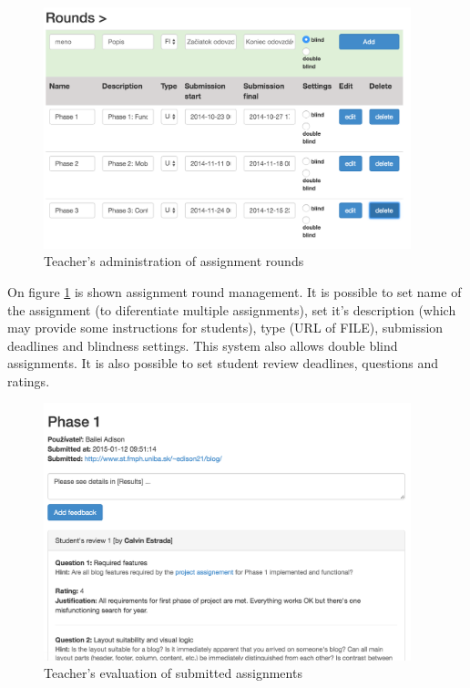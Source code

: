 \begin{figure}[h]
    \centering
    \includegraphics[width=0.95\textwidth]{images/teacherrounds.png}
    \caption{Teacher's administration of assignment rounds}
    \label{teacherrounds}
\end{figure}


On figure \ref{teacherrounds} is shown assignment round management. It is possible to set name of the assignment (to diferentiate multiple assignments), set it's description (which may provide some instructions for students), type (URL of FILE), submission deadlines and blindness settings. This system also allows double blind assignments. It is also possible to set student review deadlines, questions and ratings.

\begin{figure}[h]
    \centering
    \includegraphics[width=0.95\textwidth]{images/teachereval.png}
    \caption{Teacher's evaluation of submitted assignments}
    \label{teachereval}
\end{figure}


